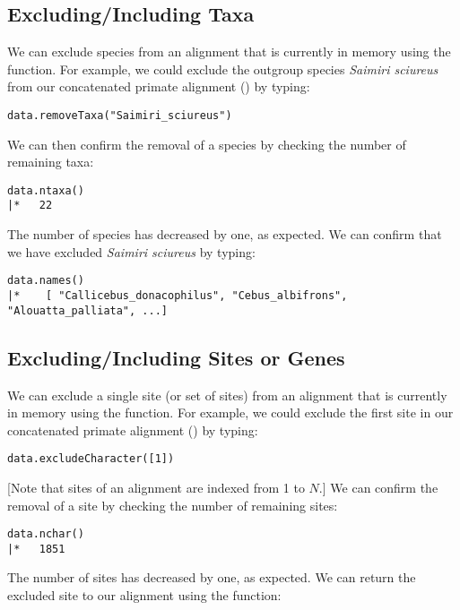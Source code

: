 \subsection{Excluding/Including Taxa}
We can exclude species from an alignment that is currently in memory using the  function.
For example, we could exclude the outgroup species \textit{Saimiri sciureus} from our concatenated primate alignment () by typing:

{\tt \begin{snugshade*}
\begin{lstlisting}
data.removeTaxa("Saimiri_sciureus")
\end{lstlisting}
\end{snugshade*}}

We can then confirm the removal of a species by checking the number of remaining taxa:
{\tt \begin{snugshade*}
\begin{lstlisting}
data.ntaxa()
|*   22
\end{lstlisting}
\end{snugshade*}}
The number of species has decreased by one, as expected.
We can confirm that we have excluded \textit{Saimiri sciureus} by typing:
{\tt \begin{snugshade*}
\begin{lstlisting}
data.names()	
|*    [ "Callicebus_donacophilus", "Cebus_albifrons", "Alouatta_palliata", ...]
\end{lstlisting}
\end{snugshade*}}

\subsection{Excluding/Including Sites or Genes}
We can exclude a single site (or set of sites) from an alignment that is currently in memory using the  function.
For example, we could exclude the first site in our concatenated primate alignment () by typing:

{\tt \begin{snugshade*}
\begin{lstlisting}
data.excludeCharacter([1])
\end{lstlisting}
\end{snugshade*}}
[Note that sites of an alignment are indexed from 1 to $N$.]
We can confirm the removal of a site by checking the number of remaining sites:

{\tt \begin{snugshade*}
\begin{lstlisting}
data.nchar()
|*   1851
\end{lstlisting}
\end{snugshade*}}
The number of sites has decreased by one, as expected.
We can return the excluded site to our alignment using the  function:

